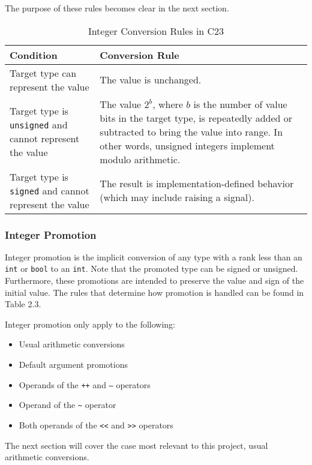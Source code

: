 The purpose of these rules becomes clear in the next section.

\newpage
\begin{table}[h!]
\centering
\begin{tabular}{|p{4cm}|p{10cm}|}
\hline
\textbf{Condition} & \textbf{Conversion Rule} \\
\hline
Target type can represent the value & The value is unchanged. \\
\hline
Target type is \texttt{unsigned} and cannot represent the value & The value $2^b$, where $b$ is the number of value bits in the target type, is repeatedly added or subtracted to bring the value into range. In other words, unsigned integers implement modulo arithmetic. \\
\hline
Target type is \texttt{signed} and cannot represent the value & The result is implementation-defined behavior (which may include raising a signal). \\
\hline
\end{tabular}
\caption{Integer Conversion Rules in C23}
\end{table}
\newpage

\subsubsection{Integer Promotion}

Integer promotion is the implicit conversion of any type with a rank less than an \texttt{int} or \texttt{bool} to an \texttt{int}. Note that the promoted type can be signed or unsigned. Furthermore, these promotions are intended to preserve the value and sign of the initial value. The rules that determine how promotion is handled can be found in Table 2.3.

Integer promotion only apply to the following:
\begin{itemize}
    \item Usual arithmetic conversions
    \item Default argument promotions
    \item Operands of the \texttt{++} and \texttt{--} operators
    \item Operand of the \texttt{\textasciitilde} operator
    \item Both operands of the \texttt{<<} and \texttt{>>} operators
\end{itemize}

The next section will cover the case most relevant to this project, usual arithmetic conversions.

